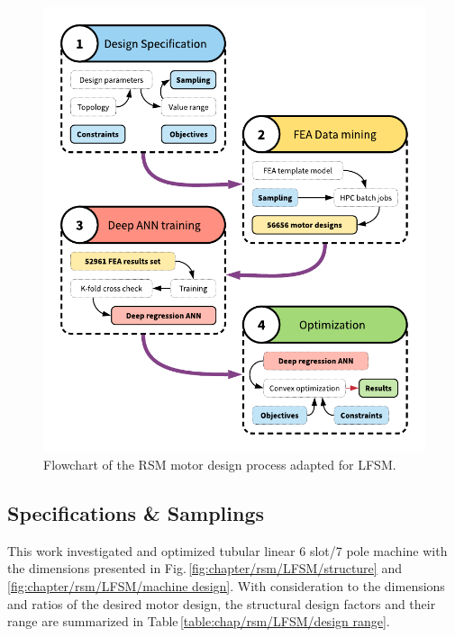    
        \begin{figure}
            \centering
            \includegraphics[width=4.5in]{chap4/images2/LFSM_design_process.pdf}
            \caption{Flowchart of the RSM motor design process adapted for \acs{LFSM}.}
            \label{fig:chapter/rsm/LFSM/design process}
        \end{figure}
    
    
        \subsection{Specifications \& Samplings}    \label{Chapter:RSM/LFSM/spec}
        
        
            This work investigated and optimized tubular linear 6 slot/7 pole machine with the dimensions presented in Fig.\,\ref{fig:chapter/rsm/LFSM/structure} and \,\ref{fig:chapter/rsm/LFSM/machine design}. With consideration to the dimensions and ratios of the desired motor design, the structural design factors and their range are summarized in Table\,\ref{table:chap/rsm/LFSM/design range}. 
            
